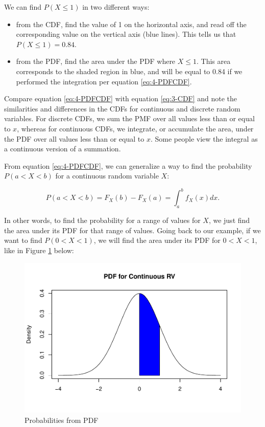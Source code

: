 \documentclass[
]{book}
\providecommand{\tightlist}{%
  \setlength{\itemsep}{0pt}\setlength{\parskip}{0pt}}
\begin{document}
We can find \(P(X \leq 1)\) in two different ways:

\begin{itemize}
\tightlist
\item
  from the CDF, find the value of 1 on the horizontal axis, and read off the corresponding value on the vertical axis (blue lines). This tells us that \(P(X \leq 1) = 0.84\).
\item
  from the PDF, find the area under the PDF where \(X \leq 1\). This area corresponds to the shaded region in blue, and will be equal to 0.84 if we performed the integration per equation \eqref{eq:4-PDFCDF}.
\end{itemize}

Compare equation \eqref{eq:4-PDFCDF} with equation \eqref{eq:3-CDF} and note the similarities and differences in the CDFs for continuous and discrete random variables. For discrete CDFs, we sum the PMF over all values less than or equal to \(x\), whereas for continuous CDFs, we integrate, or accumulate the area, under the PDF over all values less than or equal to \(x\). Some people view the integral as a continuous version of a summation.

From equation \eqref{eq:4-PDFCDF}, we can generalize a way to find the probability \(P(a<X<b)\) for a continuous random variable \(X\):

\begin{equation} 
P(a<X<b) = F_X(b) - F_X(a) = \int_{a}^{b} f_X(x) dx.
\label{eq:4-integrate}
\end{equation}

In other words, to find the probability for a range of values for \(X\), we just find the area under its PDF for that range of values. Going back to our example, if we want to find \(P(0<X<1)\), we will find the area under its PDF for \(0<X<1\), like in Figure \ref{fig:4-prob2} below:

\begin{figure}
\centering
\includegraphics{bookdown-demo_files/figure-latex/4-prob2-1.pdf}
\caption{\label{fig:4-prob2}Probabilities from PDF}
\end{figure}
\end{document}
